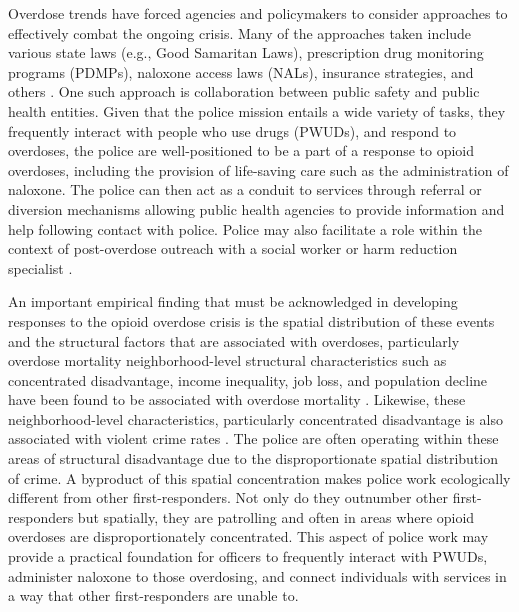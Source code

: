 Overdose trends have forced agencies and policymakers to consider approaches to effectively combat the ongoing crisis. Many of the approaches taken include various state laws (e.g., Good Samaritan Laws), prescription drug monitoring programs (PDMPs), naloxone access laws (NALs), insurance strategies, and others \parencite{haegerich_evidence_2019}. One such approach is collaboration between public safety and public health entities. Given that the police mission entails a wide variety of tasks, they frequently interact with people who use drugs (PWUDs), and respond to overdoses, the police are well-positioned to be a part of a response to opioid overdoses, including the provision of life-saving care such as the administration of naloxone. The police can then act as a conduit to services through referral or diversion mechanisms allowing public health agencies to provide information and help following contact with police.  Police may also facilitate a role within the context of post-overdose outreach with a social worker or harm reduction specialist \parencite{bagley_scoping_2019}.

An important empirical finding that must be acknowledged in developing responses to the opioid overdose crisis is the spatial distribution of these events and the structural factors that are associated with overdoses, particularly overdose mortality neighborhood-level structural characteristics such as concentrated disadvantage, income inequality, job loss, and population decline have been found to be associated with overdose mortality \parencite{carter_spatial_2019, feldmeyer_community_2022, ford_neighborhood_2017, piza_drug_2023}. Likewise, these neighborhood-level characteristics, particularly concentrated disadvantage is also associated with violent crime rates \parencite{peterson_divergent_2010}. The police are often operating within these areas of structural disadvantage due to the disproportionate spatial distribution of crime. A byproduct of this spatial concentration makes police work ecologically different from other first-responders. Not only do they outnumber other first-responders \parencite{lurigio_opioid_2018} but spatially, they are patrolling and often in areas where opioid overdoses are disproportionately concentrated. This aspect of police work may provide a practical foundation for officers to frequently interact with PWUDs, administer naloxone to those overdosing, and connect individuals with services in a way that other first-responders are unable to.


